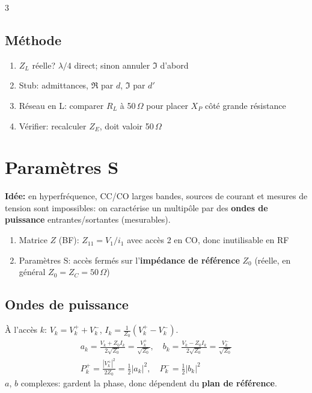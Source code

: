 \documentclass[12pt, a4paper]{article}
\begin{document}
\begin{multicols*}{3}
	\subsection{Méthode}
	\begin{enumerate}[\roman*.]
		\item $Z_L$ réelle? $\lambda/4$ direct; sinon annuler $\Im$ d'abord
		\item Stub: admittances, $\Re$ par $d$, $\Im$ par $d'$
		\item Réseau en L: comparer $R_L$ à 50\,$\Omega$ pour placer $X_P$ côté grande résistance
		\item Vérifier: recalculer $Z_E$, doit valoir 50\,$\Omega$
	\end{enumerate}

	\colbreak
	\section{Paramètres S}
	\textbf{Idée:} en hyperfréquence, CC/CO larges bandes, sources de courant et mesures de tension sont impossibles: on caractérise un multipôle par des \textbf{ondes de puissance} entrantes/sortantes (mesurables).
	\begin{enumerate}[\roman*.]
		\item Matrice $Z$ (BF): $Z_{11}=V_1/i_1$ avec accès 2 en CO, donc inutilisable en RF
		\item Paramètres S: accès fermés sur l'\textbf{impédance de référence} $Z_0$ (réelle, en général $Z_0=Z_C=50\,\Omega$)
	\end{enumerate}

	\subsection{Ondes de puissance}
	À l'accès $k$: $V_k=V_k^++V_k^-$, $I_k=\frac{1}{Z_0}(V_k^+-V_k^-)$.
	\begin{gather*}
		a_k=\frac{V_k+Z_0I_k}{2\sqrt{Z_0}}=\frac{V_k^+}{\sqrt{Z_0}},\quad b_k=\frac{V_k-Z_0I_k}{2\sqrt{Z_0}}=\frac{V_k^-}{\sqrt{Z_0}}\\
		P_k^+=\frac{|V_k^+|^2}{2Z_0}=\tfrac12|a_k|^2,\quad P_k^-=\tfrac12|b_k|^2
	\end{gather*}
	$a$, $b$ complexes: gardent la phase, donc dépendent du \textbf{plan de référence}.


\end{multicols*}
\end{document}
